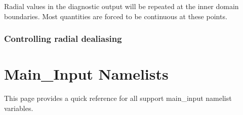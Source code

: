 \documentclass[letterpaper,11pt,english]{sphinxmanual}
\begin{document}
\begin{sphinxVerbatim}[commandchars=\\\{\}]
     
    
\end{sphinxVerbatim}

\sphinxAtStartPar
Radial values in the diagnostic output will be repeated at the inner
domain boundaries. Most quantities are forced to be continuous at these
points.


\subsection{Controlling radial dealiasing}
\label{\detokenize{doc/source/Model_Setup/grid_specification:controlling-radial-dealiasing}}

\chapter{Main\_Input Namelists}
\label{\detokenize{doc/source/Namelist_Definitions/Namelist_Variables:main-input-namelists}}\label{\detokenize{doc/source/Namelist_Definitions/Namelist_Variables:namelists}}\label{\detokenize{doc/source/Namelist_Definitions/Namelist_Variables::doc}}
\sphinxAtStartPar
This page provides a quick reference for all support main\_input namelist variables.
\end{document}
